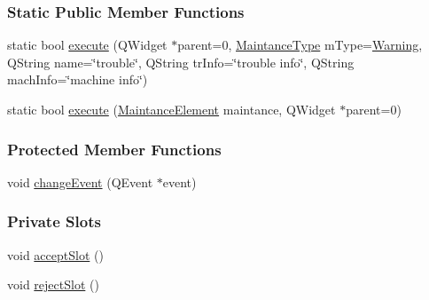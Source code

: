 \subsubsection*{Static Public Member Functions}
\begin{DoxyCompactItemize}
\item 
static bool \mbox{\hyperlink{classMaintanceDialog_adf3b798d56bad8af60553f9e04fad8a4}{execute}} (Q\+Widget $\ast$parent=0, \mbox{\hyperlink{classMaintanceDialog_a0774fde5cbe916c333d8d1dd991a3b8f}{Maintance\+Type}} m\+Type=\mbox{\hyperlink{classMaintanceDialog_a0774fde5cbe916c333d8d1dd991a3b8fa8fe148a4b5ff71d3568fd6aff35d027e}{Warning}}, Q\+String name=\char`\"{}trouble\char`\"{}, Q\+String tr\+Info=\char`\"{}trouble info\char`\"{}, Q\+String mach\+Info=\char`\"{}machine info\char`\"{})
\item 
static bool \mbox{\hyperlink{classMaintanceDialog_a1c21277543efab3d8207b64de9d8ba20}{execute}} (\mbox{\hyperlink{classMaintanceElement}{Maintance\+Element}} maintance, Q\+Widget $\ast$parent=0)
\end{DoxyCompactItemize}
\subsubsection*{Protected Member Functions}
\begin{DoxyCompactItemize}
\item 
void \mbox{\hyperlink{classMaintanceDialog_a2bd5d68e291648614735e3b62fd61bfc}{change\+Event}} (Q\+Event $\ast$event)
\end{DoxyCompactItemize}
\subsubsection*{Private Slots}
\begin{DoxyCompactItemize}
\item 
void \mbox{\hyperlink{classMaintanceDialog_a3453a9ed317177d9bf8fb4be6bfa9de6}{accept\+Slot}} ()
\item 
void \mbox{\hyperlink{classMaintanceDialog_aa92ce781e64b49dab9cb362c6521bb17}{reject\+Slot}} ()
\end{DoxyCompactItemize}
